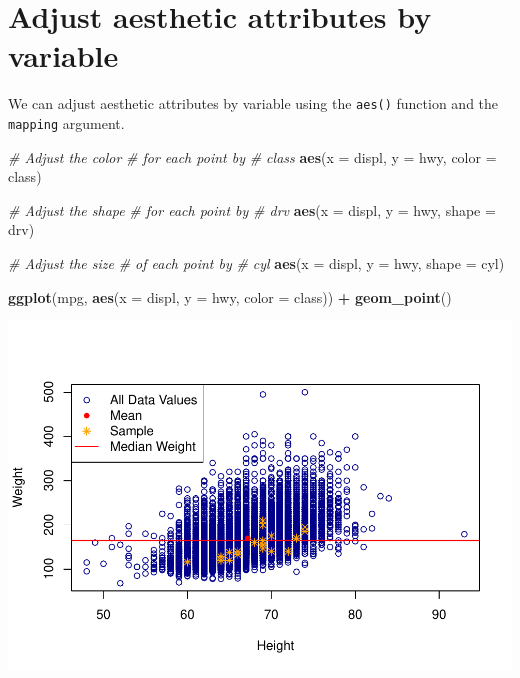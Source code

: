 \documentclass[
]{book}
\newenvironment{Shaded}{\begin{snugshade}}{\end{snugshade}}
\newcommand{\CommentTok}[1]{\textcolor[rgb]{0.56,0.35,0.01}{\textit{#1}}}
\newcommand{\DataTypeTok}[1]{\textcolor[rgb]{0.13,0.29,0.53}{#1}}
\newcommand{\KeywordTok}[1]{\textcolor[rgb]{0.13,0.29,0.53}{\textbf{#1}}}
\newcommand{\NormalTok}[1]{#1}
\newcommand{\OperatorTok}[1]{\textcolor[rgb]{0.81,0.36,0.00}{\textbf{#1}}}
\newcommand{\StringTok}[1]{\textcolor[rgb]{0.31,0.60,0.02}{#1}}
\begin{document}
\hypertarget{adjust-aesthetic-attributes-by-variable}{%
\section{Adjust aesthetic attributes by variable}\label{adjust-aesthetic-attributes-by-variable}}

We can adjust aesthetic attributes by variable using the \texttt{aes()} function and the \texttt{mapping} argument.

\begin{Shaded}
\begin{Highlighting}[]
\CommentTok{# Adjust the color}
\CommentTok{# for each point by}
\CommentTok{# class}
\KeywordTok{aes}\NormalTok{(}\DataTypeTok{x =}\NormalTok{ displ, }\DataTypeTok{y =}\NormalTok{ hwy,}
    \DataTypeTok{color =}\NormalTok{ class)}

\CommentTok{# Adjust the shape}
\CommentTok{# for each point by}
\CommentTok{# drv}
\KeywordTok{aes}\NormalTok{(}\DataTypeTok{x =}\NormalTok{ displ, }\DataTypeTok{y =}\NormalTok{ hwy,}
    \DataTypeTok{shape =}\NormalTok{ drv)}

\CommentTok{# Adjust the size}
\CommentTok{# of each point by}
\CommentTok{# cyl}
\KeywordTok{aes}\NormalTok{(}\DataTypeTok{x =}\NormalTok{ displ, }\DataTypeTok{y =}\NormalTok{ hwy,}
    \DataTypeTok{shape =}\NormalTok{ cyl)}
\end{Highlighting}
\end{Shaded}

\begin{Shaded}
\begin{Highlighting}[]
\KeywordTok{ggplot}\NormalTok{(mpg, }\KeywordTok{aes}\NormalTok{(}\DataTypeTok{x =}\NormalTok{ displ,}
    \DataTypeTok{y =}\NormalTok{ hwy, }\DataTypeTok{color =}\NormalTok{ class)) }\OperatorTok{+}
\StringTok{    }\KeywordTok{geom_point}\NormalTok{()}
\end{Highlighting}
\end{Shaded}

\includegraphics{_main_files/figure-latex/unnamed-chunk-253-1.pdf}
\end{document}
